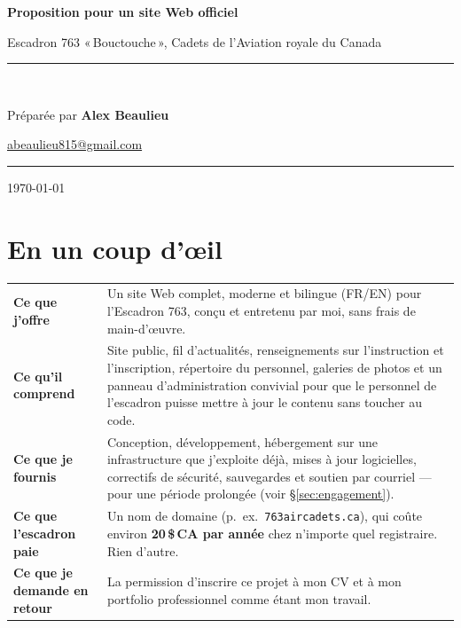 \documentclass[11pt,letterpaper]{article}
\makeatletter
\newcommand{\propTitle}{Proposition pour un site Web officiel}
\newcommand{\propSubtitle}{Escadron 763 «\,Bouctouche\,», Cadets de l'Aviation royale du Canada}
\newcommand{\propAuthor}{Alex Beaulieu}
\newcommand{\propEmail}{abeaulieu815@gmail.com}
\newcommand{\propDate}{\today}
\makeatother
\begin{document}
\begin{titlepage}
\centering
\vspace*{2cm}

{\Huge\bfseries\color{accent}\propTitle\par}
\vspace{0.6cm}
{\Large\propSubtitle\par}

\vspace{2.5cm}
\rule{0.6\linewidth}{0.4pt}\\[0.4cm]
{\large Préparée par \textbf{\propAuthor}\par}
{\normalsize \href{mailto:\propEmail}{\propEmail}\par}
\vspace{0.4cm}
\rule{0.6\linewidth}{0.4pt}

\vfill
{\normalsize\color{muted}\propDate\par}
\end{titlepage}

\section*{En un coup d'\oe{}il}

\begin{tabularx}{\linewidth}{@{}l X@{}}
\toprule
\textbf{Ce que j'offre} & Un site Web complet, moderne et bilingue (FR/EN) pour l'Escadron 763, conçu et entretenu par moi, sans frais de main-d'\oe{}uvre. \\
\textbf{Ce qu'il comprend} & Site public, fil d'actualités, renseignements sur l'instruction et l'inscription, répertoire du personnel, galeries de photos et un panneau d'administration convivial pour que le personnel de l'escadron puisse mettre à jour le contenu sans toucher au code. \\
\textbf{Ce que je fournis} & Conception, développement, hébergement sur une infrastructure que j'exploite déjà, mises à jour logicielles, correctifs de sécurité, sauvegardes et soutien par courriel --- pour une période prolongée (voir \S\ref{sec:engagement}). \\
\textbf{Ce que l'escadron paie} & Un nom de domaine (p.~ex.\ \texttt{763aircadets.ca}), qui coûte environ \textbf{20\,\$\,CA par année} chez n'importe quel registraire. Rien d'autre. \\
\textbf{Ce que je demande en retour} & La permission d'inscrire ce projet à mon CV et à mon portfolio professionnel comme étant mon travail. \\
\bottomrule
\end{tabularx}
\end{document}
